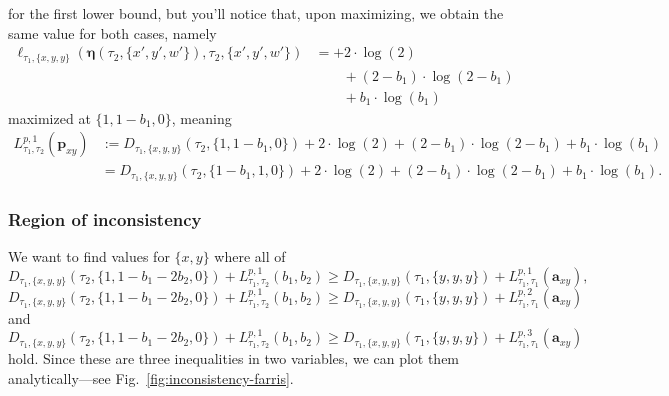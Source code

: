 \documentclass[a4paper]{article}
\newcommand{\fullAncestralSplitPartitions}{\boldsymbol\eta}
\newcommand{\shannonDivergence}{D}
\begin{document}
for the first lower bound, but you'll notice that, upon maximizing, we obtain the same value for both cases, namely
\begin{align*}
    \ell_{\tau_1,\{x,y,y\}}(\fullAncestralSplitPartitions(\tau_2,\{x',y',w'\}),\tau_2,\{x',y',w'\})
    &=      + 2\cdot\log(2) \\
    &\qquad + (2-b_{1})  \cdot\log(2-b_{1}) \\
    &\qquad + b_{1}      \cdot\log(b_{1})
\end{align*}
maximized at $\{1,1-b_{1},0\}$, meaning
\begin{align*}
    L^{p,1}_{\tau_1,\tau_2}(\mathbf{p}_{xy}) &:= \shannonDivergence_{\tau_1,\{x,y,y\}}(\tau_2,\{1,1-b_{1},0\}) + 2\cdot\log(2) + (2-b_{1})\cdot\log(2-b_{1})+b_{1}\cdot\log(b_{1}) \\
                                             &= \shannonDivergence_{\tau_1,\{x,y,y\}}(\tau_2,\{1-b_{1},1,0\}) + 2\cdot\log(2) + (2-b_{1})\cdot\log(2-b_{1})+b_{1}\cdot\log(b_{1}).
\end{align*}

\subsubsection{Region of inconsistency}

We want to find values for $\{x,y\}$ where all of
$$
\shannonDivergence_{\tau_1,\{x,y,y\}}(\tau_2,\{1, 1-b_{1}-2b_{2}, 0\}) + L^{p,1}_{\tau_1,\tau_2}(b_{1},b_{2}) \ge \shannonDivergence_{\tau_1,\{x,y,y\}}(\tau_1,\{y, y, y\}) + L^{p,1}_{\tau_1,\tau_1}(\mathbf{a}_{xy}),
$$
$$
\shannonDivergence_{\tau_1,\{x,y,y\}}(\tau_2,\{1, 1-b_{1}-2b_{2}, 0\}) + L^{p,1}_{\tau_1,\tau_2}(b_{1},b_{2}) \ge \shannonDivergence_{\tau_1,\{x,y,y\}}(\tau_1,\{y, y, y\}) + L^{p,2}_{\tau_1,\tau_1}(\mathbf{a}_{xy})
$$
and
$$
\shannonDivergence_{\tau_1,\{x,y,y\}}(\tau_2,\{1, 1-b_{1}-2b_{2}, 0\}) + L^{p,1}_{\tau_1,\tau_2}(b_{1},b_{2}) \ge \shannonDivergence_{\tau_1,\{x,y,y\}}(\tau_1,\{y, y, y\}) + L^{p,3}_{\tau_1,\tau_1}(\mathbf{a}_{xy})
$$
hold.
Since these are three inequalities in two variables, we can plot them analytically---see Fig.~\ref{fig:inconsistency-farris}.
\end{document}
